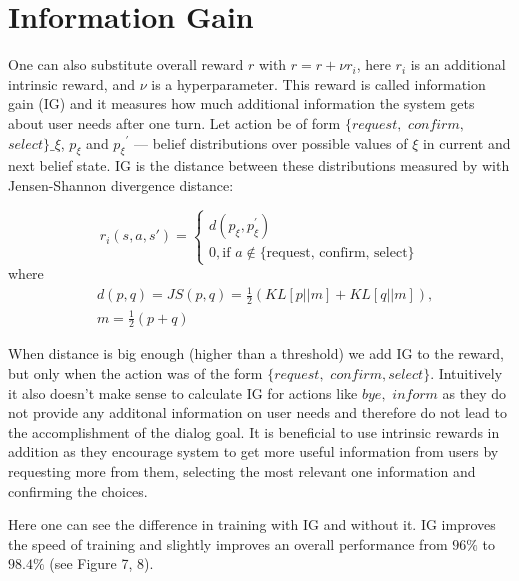 \documentclass[12pt,titlepage,a4paper]{article}
\begin{document}
\pagebreak
\section{Information Gain}

One can also substitute overall reward $r$ with $r = r + \nu r_i$, here $r_i$ is an additional intrinsic reward, and $\nu$ is a hyperparameter. This reward is called information gain (IG) and it measures how much additional information the system gets about user needs after one turn. Let action be of form $\{request,$  $confirm,$ $select\}\_\xi$, $p_{\xi}$ and ${p_{\xi}}^\prime$ --- belief distributions over possible values of $\xi$ in current and next belief state. IG is the distance between these distributions measured by with Jensen-Shannon di\-vergence distance:

\begin{equation}
    r_i(s, a, s\prime) =
    \begin{cases}
        d(p_{\xi}, p_{\xi}^\prime) \\
        0, \text{if } a \notin \text{\{request, confirm, select\}}
    \end{cases}
\end{equation}
where
\begin{equation}
    \begin{aligned}
        &d(p, q) = JS(p,q) = \frac{1}{2}(KL[p||m] + KL[q||m]), \\
        &m = \frac{1}{2}(p + q)
    \end{aligned}
\end{equation}

When distance is big enough (higher than a threshold) we add IG to the reward, but only when the action was of the form $\{request,$ $ confirm, select\}$. Intuitively it also doesn't make sense to calculate IG for actions like $bye,$ $inform$ as they do not provide any additonal infor\-mation on user needs and therefore do not lead to the accomplishment of the dialog goal. It is beneficial to use intrinsic rewards in addition as they encourage system to get more useful information from users by requesting more from them, selecting the most relevant one information and confirming the choices.

Here one can see the difference in training with IG and without it. IG improves the speed of training and slightly improves an overall performance from $96\%$  to $98.4\%$ (see Figure 7, 8).
\end{document}
